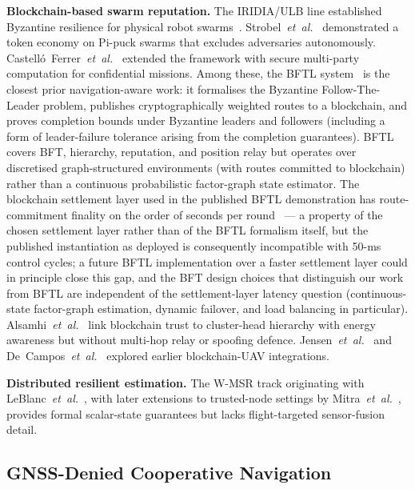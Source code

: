 \documentclass[journal,10pt,twocolumn]{IEEEtran}
\begin{document}
\textbf{Blockchain-based swarm reputation.} The IRIDIA/ULB line established Byzantine resilience for physical robot swarms~\cite{strobel2020blockchain,strobel2023robot,vancalck2023cooperation,dorigo2024nature}. Strobel~\emph{et~al.}~\cite{strobel2023robot} demonstrated a token economy on Pi-puck swarms that excludes adversaries autonomously. Castelló~Ferrer~\emph{et~al.}~\cite{castelloferrer2021secure} extended the framework with secure multi-party computation for confidential missions. Among these, the BFTL system~\cite{castelloferrer2022bftl} is the closest prior navigation-aware work: it formalises the Byzantine Follow-The-Leader problem, publishes cryptographically weighted routes to a blockchain, and proves completion bounds under Byzantine leaders and followers (including a form of leader-failure tolerance arising from the completion guarantees). BFTL covers BFT, hierarchy, reputation, and position relay but operates over discretised graph-structured environments (with routes committed to blockchain) rather than a continuous probabilistic factor-graph state estimator. The blockchain settlement layer used in the published BFTL demonstration has route-commitment finality on the order of seconds per round~\cite{strobel2020blockchain} --- a property of the chosen settlement layer rather than of the BFTL formalism itself, but the published instantiation as deployed is consequently incompatible with 50-ms control cycles; a future BFTL implementation over a faster settlement layer could in principle close this gap, and the BFT design choices that distinguish our work from BFTL are independent of the settlement-layer latency question (continuous-state factor-graph estimation, dynamic failover, and load balancing in particular). Alsamhi~\emph{et~al.}~\cite{alsamhi2023blockchain} link blockchain trust to cluster-head hierarchy with energy awareness but without multi-hop relay or spoofing defence. Jensen~\emph{et~al.}~\cite{jensen2019blockchain} and De~Campos~\emph{et~al.}~\cite{decampos2021iota} explored earlier blockchain-UAV integrations.

\textbf{Distributed resilient estimation.} The W-MSR track originating with LeBlanc~\emph{et~al.}~\cite{leblanc2013resilient}, with later extensions to trusted-node settings by Mitra~\emph{et~al.}~\cite{mitra2019resilient}, provides formal scalar-state guarantees but lacks flight-targeted sensor-fusion detail.

\subsection{GNSS-Denied Cooperative Navigation}
\end{document}
